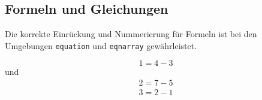\documentclass{lni}
\begin{document}
\subsection{Formeln und Gleichungen}

Die korrekte Einrückung und Nummerierung für Formeln ist bei den Umgebungen \texttt{equation} und \texttt{eqnarray} gewährleistet.

\begin{equation}
  1=4-3
\end{equation}
und
\begin{eqnarray}
  2=7-5\\
  3=2-1
\end{eqnarray}

%


\end{document}
